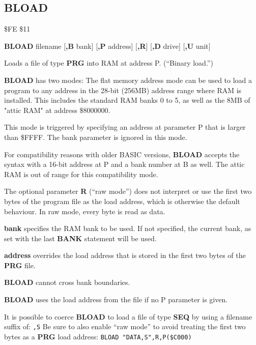 
\newpage
\subsection{BLOAD}
\begin{description}[leftmargin=2cm,style=nextline]
\item [Token:] \$FE \$11
\item [Format:] {\bf BLOAD} filename [{\bf,B} bank] [{\bf,P} address] [{\bf,R}]
		[{\bf,D} drive] [{\bf,U} unit]
\item [Usage:]
   Loads a file of type {\bf PRG} into RAM at address P. (``Binary load.'')

   {\bf BLOAD} has two modes:
   The flat memory address mode can be used to load a program to any
   address in the 28-bit (256MB) address range where RAM is installed.
   This includes the standard RAM banks 0 to 5, as well as
   the 8MB of "attic RAM" at address \$8000000.

   This mode is triggered by specifying an address at parameter P
   that is larger than \$FFFF. The bank parameter is ignored in this mode.

   For compatibility reasons with older BASIC versions, {\bf BLOAD}
   accepts the syntax with a 16-bit address at P and a bank number at B as well.
   The attic RAM is out of range for this compatibility mode.

   The optional parameter {\bf R} (``raw mode'') does not interpret or use the
   first two bytes of the program file as the load address, which is otherwise the
   default behaviour. In raw mode, every byte is read as data.

   \filenamedefinition

   {\bf bank} specifies the RAM bank to be used.
   If not specified, the current bank, as set with the last
   {\bf BANK} statement will be used.

   {\bf address} overrides the load address
   that is stored in the first two bytes of the {\bf PRG} file.

   \drivedefinition

   \unitdefinition

\item [Remarks:]
   {\bf BLOAD} cannot cross bank boundaries.

{\bf BLOAD} uses the load address from the file if no P parameter is given.

   It is possible to coerce {\bf BLOAD} to load a file of type {\bf SEQ} by using a filename suffix of: \texttt{,S} Be sure to also enable ``raw mode'' to avoid treating the first two bytes as a {\bf PRG} load address: \texttt{BLOAD "DATA,S",R,P(\$C000)}


\end{description}
